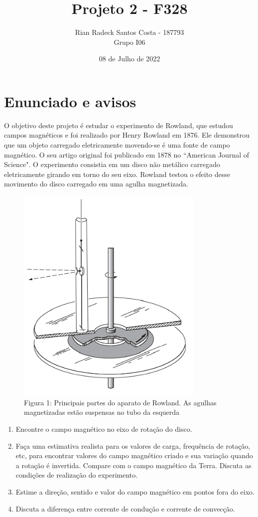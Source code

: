 \documentclass[12pt, letterpaper]{article}
\title{Projeto 2 - F328}
\author{Rian Radeck Santos Costa - 187793 \\ Grupo I06}
\date{08 de Julho de 2022}
\begin{document}
\maketitle
\newpage
\tableofcontents
\newpage

\section{Enunciado e avisos}
	O objetivo deste projeto é estudar o experimento de Rowland, que estudou campos magnéticos e foi realizado por Henry Rowland em 1876. Ele demonstrou que um objeto carregado eletricamente movendo-se é uma fonte de campo magnético. O seu artigo original foi publicado em 1878 no ``American Journal of Science". O experimento consistia em um disco não metálico carregado eletricamente girando em torno do seu eixo. Rowland testou o efeito desse movimento do disco carregado em uma agulha magnetizada.

	\begin{figure}[h]
        \centering
        \includegraphics[width=0.8\textwidth]{rowland}
        \\{Figura 1: Principais partes do aparato de Rowland. As agulhas magnetizadas estão suspensas no tubo da esquerda}
        \label{fig:rowland}
    \end{figure}

    \begin{enumerate}
    	\item Encontre o campo magnético no eixo de rotação do disco.
    	\item Faça uma estimativa realista para os valores de carga, frequência de rotação, etc, para encontrar valores do campo magnético criado e sua variação quando a rotação é invertida. Compare com o campo magnético da Terra. Discuta as condições de realização do experimento.
    	\item Estime a direção, sentido e valor do campo magnético em pontos fora do eixo.
    	\item Discuta a diferença entre corrente de condução e corrente de convecção.
    \end{enumerate}
\end{document}

